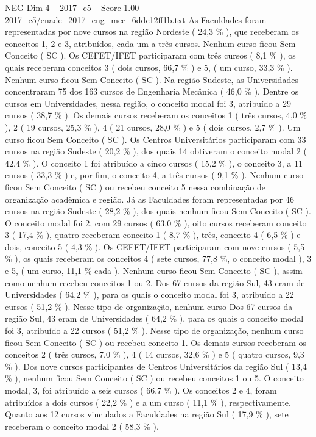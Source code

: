 \begin{textsample}{NEG Dim 4 – 2017\_c5 – Score 1.00 – 2017\_c5/enade\_2017\_eng\_mec\_6ddc12ff1b.txt}
As Faculdades foram representadas por nove cursos na região Nordeste ( 24,3 \% ), que receberam os conceitos 1, 2 e 3, atribuídos, cada um a três cursos.
Nenhum curso ficou Sem Conceito ( SC ).
Os CEFET/IFET participaram com três cursos ( 8,1 \% ), os quais receberam conceitos 3 ( dois cursos, 66,7 \% ) e 5, ( um curso, 33,3 \% ).
Nenhum curso ficou Sem Conceito ( SC ).
Na região Sudeste, as Universidades concentraram 75 dos 163 cursos de Engenharia Mecânica ( 46,0 \% ).
Dentre os cursos em Universidades, nessa região, o conceito modal foi 3, atribuído a 29 cursos ( 38,7 \% ).
Os demais cursos receberam os conceitos 1 ( três cursos, 4,0 \% ), 2 ( 19 cursos, 25,3 \% ), 4 ( 21 cursos, 28,0 \% ) e 5 ( dois cursos, 2,7 \% ).
Um curso ficou Sem Conceito ( SC ).
Os Centros Universitários participaram com 33 cursos na região Sudeste ( 20,2 \% ), dos quais 14 obtiveram o conceito modal 2 ( 42,4 \% ).
O conceito 1 foi atribuído a cinco cursos ( 15,2 \% ), o conceito 3, a 11 cursos ( 33,3 \% ) e, por fim, o conceito 4, a três cursos ( 9,1 \% ).
Nenhum curso ficou Sem Conceito ( SC ) ou recebeu conceito 5 nessa combinação de organização acadêmica e região.
Já as Faculdades foram representadas por 46 cursos na região Sudeste ( 28,2 \% ), dos quais nenhum ficou Sem Conceito ( SC ).
O conceito modal foi 2, com 29 cursos ( 63,0 \% ), oito cursos receberam conceito 3 ( 17,4 \% ), quatro receberam conceito 1 ( 8,7 \% ), três, conceito 4 ( 6,5 \% ) e dois, conceito 5 ( 4,3 \% ).
Os CEFET/IFET participaram com nove cursos ( 5,5 \% ), os quais receberam os conceitos 4 ( sete cursos, 77,8 \%, o conceito modal ), 3 e 5, ( um curso, 11,1 \% cada ).
Nenhum curso ficou Sem Conceito ( SC ), assim como nenhum recebeu conceitos 1 ou 2.
Dos 67 cursos da região Sul, 43 eram de Universidades ( 64,2 \% ), para os quais o conceito modal foi 3, atribuído a 22 cursos ( 51,2 \% ).
Nesse tipo de organização, nenhum curso Dos 67 cursos da região Sul, 43 eram de Universidades ( 64,2 \% ), para os quais o conceito modal foi 3, atribuído a 22 cursos ( 51,2 \% ).
Nesse tipo de organização, nenhum curso ficou Sem Conceito ( SC ) ou recebeu conceito 1.
Os demais cursos receberam os conceitos 2 ( três cursos, 7,0 \% ), 4 ( 14 cursos, 32,6 \% ) e 5 ( quatro cursos, 9,3 \% ).
Dos nove cursos participantes de Centros Universitários da região Sul ( 13,4 \% ), nenhum ficou Sem Conceito ( SC ) ou recebeu conceitos 1 ou 5.
O conceito modal, 3, foi atribuído a seis cursos ( 66,7 \% ).
Os conceitos 2 e 4, foram atribuídos a dois cursos ( 22,2 \% ) e a um curso ( 11,1 \% ), respectivamente.
Quanto aos 12 cursos vinculados a Faculdades na região Sul ( 17,9 \% ), sete receberam o conceito modal 2 ( 58,3 \% ).

\end{textsample}
